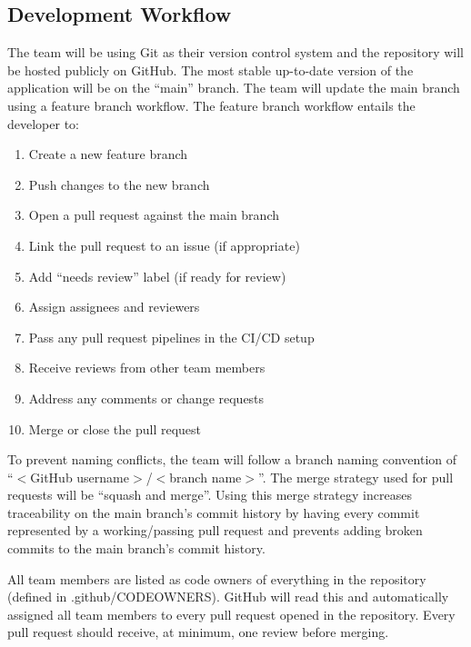 \documentclass{article}
\begin{document}

\subsection{Development Workflow}

The team will be using Git as their version control system and the repository will be hosted
publicly on GitHub. The most stable up-to-date version of the application will be on the ``main''
branch. The team will update the main branch using a feature branch workflow. The feature branch
workflow entails the developer to:

\begin{enumerate}
	\item Create a new feature branch
	\item Push changes to the new branch
	\item Open a pull request against the main branch
	\item Link the pull request to an issue (if appropriate)
	\item Add ``needs review'' label (if ready for review)
	\item Assign assignees and reviewers
	\item Pass any pull request pipelines in the CI/CD setup
	\item Receive reviews from other team members
	\item Address any comments or change requests
	\item Merge or close the pull request
\end{enumerate}

To prevent naming conflicts, the team will follow a branch naming convention of ``$<$GitHub
username$>$/$<$branch name$>$''. The merge strategy used for pull requests will be ``squash and
merge''. Using this merge strategy increases traceability on the main branch's commit history by
having every commit represented by a working/passing pull request and prevents adding broken
commits to the main branch's commit history.

All team members are listed as code owners of everything in the repository (defined in
.github/CODEOWNERS). GitHub will read this and automatically assigned all team members to every
pull request opened in the repository. Every pull request should receive, at minimum, one review
before merging.
\end{document}
